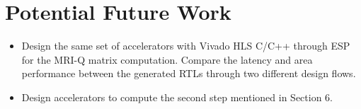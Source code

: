 \section{Potential Future Work}
\begin{itemize}

\item Design the same set of accelerators with Vivado HLS C/C++ through ESP for
  the MRI-Q matrix computation. Compare the latency and area performance between
  the generated RTLs through two different design flows.

\item Design accelerators to compute the second step mentioned in Section 6.

\end{itemize}
